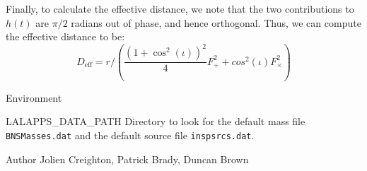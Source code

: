 \begin{entry}
Finally, to calculate the effective distance, we note that the two contributions
to $h(t)$ are $\pi/2$ radians out of phase, and hence orthogonal.  Thus, we can
compute the effective distance to be:
%
\begin{equation}
  D_{\mathrm{eff}} = r / \left( \frac{ (1 + \cos^2(\iota))^2 }{4} F_{+}^{2} +
      cos^{2}(\iota) F_{\times}^{2} \right)
\end{equation}      
%

\item[Environment]\leavevmode
\begin{entry}
\item[LALAPPS\_DATA\_PATH] Directory to look for the default mass
file \verb+BNSMasses.dat+ and the default source file \verb+inspsrcs.dat+.
\end{entry}


\item[Author] 
Jolien Creighton, Patrick Brady, Duncan Brown
\end{entry}


